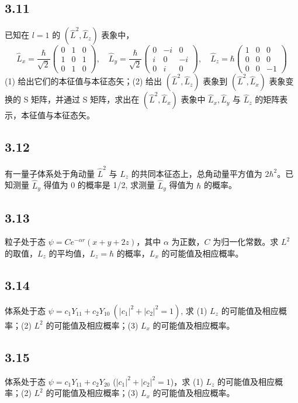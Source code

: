 \subsection{3.11}
已知在 $l=1$ 的 $(\hat{L}^2, \hat{L}_z)$ 表象中，
$$\hat{L}_x = \frac{\hbar}{\sqrt{2}} \begin{pmatrix}
0 & 1 & 0 \\
1 & 0 & 1 \\
0 & 1 & 0
\end{pmatrix}, \quad \hat{L}_y = \frac{\hbar}{\sqrt{2}} \begin{pmatrix}
0 & -i & 0 \\
i & 0 & -i \\
0 & i & 0
\end{pmatrix}, \quad \hat{L}_z = \hbar \begin{pmatrix}
1 & 0 & 0 \\
0 & 0 & 0 \\
0 & 0 & -1
\end{pmatrix}$$
(1) 给出它们的本征值与本征态矢；(2) 给出 $(\hat{L}^2, \hat{L}_z)$ 表象到 $(\hat{L}^2, \hat{L}_x)$ 表象变换的 S 矩阵，并通过 S 矩阵，求出在 $(\hat{L}^2, \hat{L}_x)$ 表象中 $\hat{L}_x, \hat{L}_y$ 与 $\hat{L}_z$ 的矩阵表示，本征值与本征态矢。

\subsection{3.12}
有一量子体系处于角动量 $\hat{L}^2$ 与 $\hat{L}_z$ 的共同本征态上，总角动量平方值为 $2\hbar^2$。已知测量 $\hat{L}_y$ 得值为 0 的概率是 1/2, 求测量 $\hat{L}_y$ 得值为 $\hbar$ 的概率。

\subsection{3.13}
粒子处于态 $\psi = Ce^{-\alpha r}(x+y+2z)$，其中 $\alpha$ 为正数，$C$ 为归一化常数。求 $L^2$ 的取值，$L_z$ 的平均值，$L_z = \hbar$ 的概率，$L_x$ 的可能值及相应概率。

\subsection{3.14}
体系处于态 $\psi = c_1 Y_{11} + c_2 Y_{10} \ (|c_1|^2 + |c_2|^2 = 1)$, 求 (1) $L_z$ 的可能值及相应概率；(2) $L^2$ 的可能值及相应概率；(3) $L_x$ 的可能值及相应概率。

\subsection{3.15}
体系处于态 $\psi = c_1 Y_{11} + c_2 Y_{20} $ ($|c_1|^2 + |c_2|^2 = 1$)，求 (1) $L_z$ 的可能值及相应概率；(2) $L^2$ 的可能值及相应概率；(3) $L_x$ 的可能值及相应概率。

